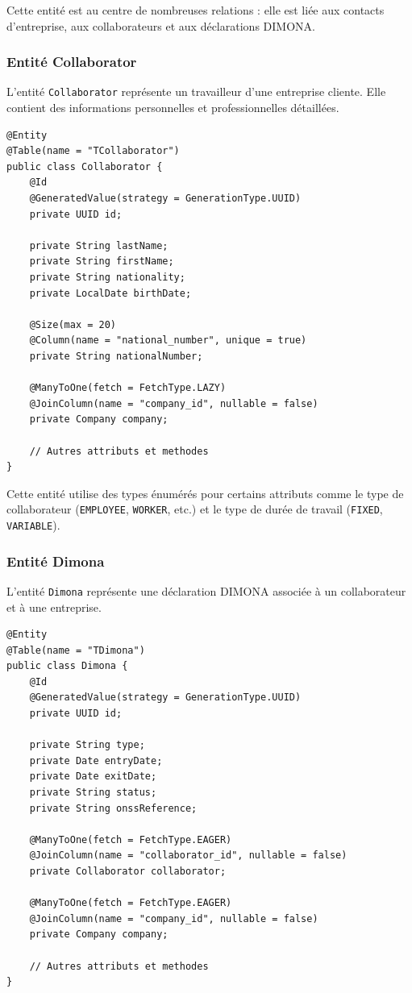\documentclass[12pt,a4paper]{report}
\begin{document}
Cette entité est au centre de nombreuses relations : elle est liée aux contacts d'entreprise, aux collaborateurs et aux déclarations DIMONA.

\subsubsection{Entité Collaborator}

L'entité \texttt{Collaborator} représente un travailleur d'une entreprise cliente. Elle contient des informations personnelles et professionnelles détaillées.

\begin{lstlisting}
@Entity
@Table(name = "TCollaborator")
public class Collaborator {
    @Id
    @GeneratedValue(strategy = GenerationType.UUID)
    private UUID id;
    
    private String lastName;
    private String firstName;
    private String nationality;
    private LocalDate birthDate;
    
    @Size(max = 20)
    @Column(name = "national_number", unique = true)
    private String nationalNumber;
    
    @ManyToOne(fetch = FetchType.LAZY)
    @JoinColumn(name = "company_id", nullable = false)
    private Company company;
    
    // Autres attributs et methodes
}
\end{lstlisting}

Cette entité utilise des types énumérés pour certains attributs comme le type de collaborateur (\texttt{EMPLOYEE}, \texttt{WORKER}, etc.) et le type de durée de travail (\texttt{FIXED}, \texttt{VARIABLE}).

\subsubsection{Entité Dimona}

L'entité \texttt{Dimona} représente une déclaration DIMONA associée à un collaborateur et à une entreprise.

\begin{lstlisting}
@Entity
@Table(name = "TDimona")
public class Dimona {
    @Id
    @GeneratedValue(strategy = GenerationType.UUID)
    private UUID id;
    
    private String type;
    private Date entryDate;
    private Date exitDate;
    private String status;
    private String onssReference;
    
    @ManyToOne(fetch = FetchType.EAGER)
    @JoinColumn(name = "collaborator_id", nullable = false)
    private Collaborator collaborator;
    
    @ManyToOne(fetch = FetchType.EAGER)
    @JoinColumn(name = "company_id", nullable = false)
    private Company company;
    
    // Autres attributs et methodes
}
\end{lstlisting}
\end{document}
